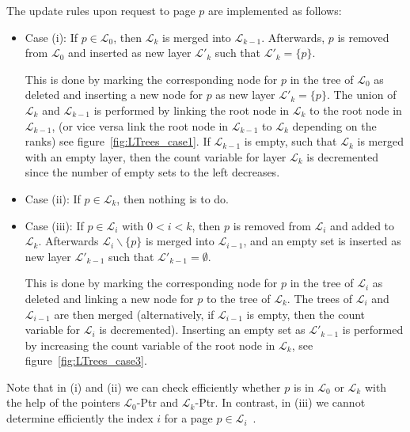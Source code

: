 \documentclass[a4paper,12pt, titlepage]{article}  %
\newcommand{\cl}{\mathcal{L}}   %
\begin{document}
\noindent The update rules upon request to page $p$ are implemented as follows: 
\begin{itemize}
\item Case (i): If $p \in \cl_0$, then $\cl_k$ is merged into $\cl_{k-1}$. Afterwards, $p$ is removed from
    $\cl_0$ and inserted as new layer $\cl'_k$ such that $\cl'_k=\{p\}$.
    
    This is done by marking the corresponding node for $p$ in the tree of $\cl_0$ as deleted
    and inserting a new node for $p$ as new layer $\cl'_k=\{p\}$. The union of $\cl_k$ and $\cl_{k-1}$
    is performed by linking the root node in $\cl_k$ to the root node in $\cl_{k-1}$,
    (or vice versa link the root node in $\cl_{k-1}$ to $\cl_k$ depending on the ranks) 
    see figure~\ref{fig:LTrees_case1}. If $\cl_{k-1}$ is empty, such that $\cl_{k}$ is merged
    with an empty layer, then the count variable for layer $\cl_k$ is decremented since the number
    of empty sets to the left decreases.  
    
\item Case (ii): If $p \in \cl_k$, then nothing is to do. 
\item Case (iii): If $p \in \cl_i$ with $0<i<k$, then $p$ is removed from $\cl_i$ and added to $\cl_k$.
                 Afterwards $\cl_i \backslash \{p\}$ is merged into $\cl_{i-1}$, and an empty set is inserted as 
		    new layer $\cl'_{k-1}$ such that $\cl'_{k-1}=\emptyset$.
	
		    This is done by marking the corresponding node for $p$ in the tree of $\cl_i$ as deleted 
		    and linking a new node for $p$ to the tree of $\cl_k$. The trees of $\cl_i$ and $\cl_{i-1}$
                 are then merged (alternatively, if $\cl_{i-1}$ is empty, then the count variable for $\cl_i$ is decremented). 
                  Inserting an empty set as $\cl'_{k-1}$ is performed by increasing the count
                 variable of the root node in $\cl_k$, see figure~\ref{fig:LTrees_case3}.  
\end{itemize}

\noindent Note that in (i) and (ii) we can check efficiently whether $p$ is in $\cl_0$ or $\cl_k$ with the help
of the pointers $\cl_0$-Ptr and $\cl_k$-Ptr. In contrast, in (iii) we cannot determine efficiently the index $i$
for a page $p \in \cl_i$~\cite{LTrees_find_index_i}.
\end{document}
